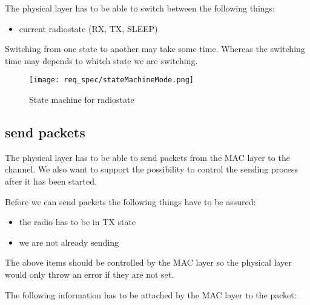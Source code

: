 The physical layer has to be able to switch between the following things:

\begin{itemize}
 \item current radiostate (RX, TX, SLEEP)
\end{itemize}

Switching from one state to another may take some time. Whereas the switching time may depends to whitch state we are switching.

\begin{figure}[H]
 \centering
 \texttt{[image: req\_spec/stateMachineMode.png]}
 \caption{State machine for radiostate}
 \label{fig:mode state machine}
\end{figure}


\subsection{send packets}
\label{subSendPackets}

The physical layer has to be able to send packets from the MAC layer to the channel. 
We also want to support the possibility to control
the sending process after it has been started.

Before we can send packets the following things have to be 
assured:
\begin{itemize}
 \item the radio has to be in TX state
 \item we are not already sending
\end{itemize}

The above items should be controlled by the MAC layer so the physical layer would only throw an error if they are not set.

The following information has to be attached by the MAC layer to the packet:

